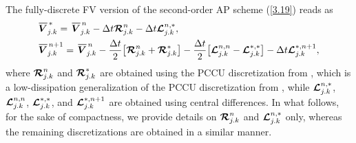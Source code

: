 \documentclass[A4paper,12pt,twoside]{article}
\numberwithin{equation}{section}
\numberwithin{figure}{section}
\numberwithin{table}{section}
\newcommand{\dt}{\Delta t}
\newcommand\eref[1]{(\ref{#1})}
\newcommand*\xbar[1]{%
  \hbox{%
    \vbox{%
      \hrule height 0.5pt %
      \kern0.4ex%
      \hbox{%
        \kern-0.05em%
        \ensuremath{#1}%
        \kern-0.00em%
      }%
    }%
  }%
}
\newcommand{\lore}[1]{{\leavevmode\color{red} #1}}
\begin{document}
\lore{The fully-discrete} FV \lore{version} of the second-order AP scheme \eref{3.19} reads as
\begin{align}
&\xbar{\bm V}^{\,*}_{j.k}=\,\xbar{\bm V}^{\,n}_{j.k}-\dt\bm{{\cal R}}^n_{j.k}-\dt\bm{{\cal L}}^{n,*}_{j.k},\label{3.31a}\\
&\xbar{\bm V}^{\,n+1}_{j.k}=\,\xbar{\bm V}^{\,n}_{j.k}-\frac{\dt}{2}\big[\bm{{\cal R}}^n_{j.k}+\bm{{\cal R}}^*_{j.k}\big]-
\frac{\dt}{2}\big[\bm{{\cal L}}^{n,n}_{j.k}-\bm{{\cal L}}^{*,*}_{j.k}\big]-\dt\bm{{\cal L}}^{*,n+1}_{j.k},\label{3.31b}
\end{align}
where $\bm{{\cal R}}^n_{j.k}$ and $\bm{{\cal R}}^*_{j.k}$ are obtained using the PCCU discretization from \cite{ACKM,CKN22}, which is a
low-dissipation generalization of the PCCU discretization from \cite{diaz2019path}, while $\bm{{\cal L}}^{n,*}_{j.k}$,
$\bm{{\cal L}}^{n,n}_{j.k}$, $\bm{{\cal L}}^{*,*}_{j.k}$, and $\bm{{\cal L}}^{*,n+1}_{j.k}$ are obtained using \lore{central} differences. In what
follows, \lore{for the sake of compactness}, we provide details on $\bm{{\cal R}}^n_{j.k}$ and $\bm{{\cal L}}^{n,*}_{j.k}$ only, whereas the remaining discretizations are
obtained in a similar manner.
\end{document}
